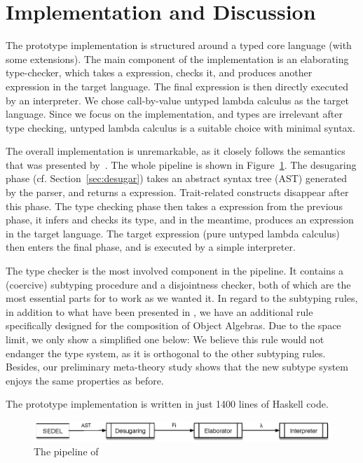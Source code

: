 \section{Implementation and Discussion}

The \name prototype implementation is structured around a typed core language
(\bname with some extensions). The main component of the implementation is an
elaborating type-checker, which takes a \bname expression, checks it, and
produces another expression in the target language. The final expression is then
directly executed by an interpreter. We chose call-by-value untyped lambda
calculus as the target language. Since we focus on the implementation, and types
are irrelevant after type checking, untyped lambda calculus is a suitable choice
with minimal syntax.

The overall implementation is unremarkable, as it closely follows the semantics
that was presented by~\citet{alpuimdisjoint}. The whole pipeline is shown in
Figure~\ref{fig:pipeline}. The desugaring phase (cf. Section~\ref{sec:desugar})
takes an abstract syntax tree (AST) generated by the parser, and returns a
\bname expression. Trait-related constructs disappear after this phase. The type
checking phase then takes a \bname expression from the previous phase, it infers
and checks its type, and in the meantime, produces an expression in the target
language. The target expression (pure untyped lambda calculus) then enters the
final phase, and is executed by a simple interpreter.

The type checker is the most involved component in the pipeline. It contains a
(coercive) subtyping procedure and a disjointness checker, both of which are the
most essential parts for \name to work as we wanted it. In regard to the
subtyping rules, in addition to what have been presented in
\citet{alpuimdisjoint}, we have an additional rule specifically designed for the
composition of Object Algebras. Due to the space limit, we only show a
simplified one below: \ottusedrule{\ottdruleSubXXR{}} We believe this rule would
not endanger the type system, as it is orthogonal to the other subtyping rules.
Besides, our preliminary meta-theory study shows that the new subtype system
enjoys the same properties as before.

The prototype implementation is written in just 1400 lines of Haskell code.

\begin{figure}[t]
  \centering
  \includegraphics[scale=0.9]{pipeline.eps}
  \caption{The pipeline of \name}
  \label{fig:pipeline}
\end{figure}